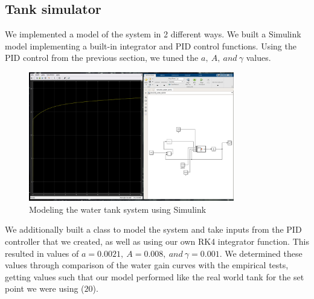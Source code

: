 \documentclass{article}
\begin{document}
\subsection{Tank simulator}
We implemented a model of the system in 2 different ways. We built a Simulink model implementing a built-in integrator and PID control functions. Using the PID control from the previous section, we tuned the $a,\ A,\ and\ \gamma$ values. 
\begin{figure}[H]
    \centering
    \includegraphics[width=0.8\textwidth]{simulink_model.jpg}
    \caption{Modeling the water tank system using Simulink}
    \label{fig:simulink}
\end{figure}

We additionally built a class to model the system and take inputs from the PID controller that we created, as well as using our own RK4 integrator function.
This resulted in values of $a=0.0021,\ A=0.008,\ and\ \gamma=0.001$. We determined these values through comparison of the water gain curves with the empirical tests, getting values such that our model performed like the real world tank for the set point we were using ($20$).
\end{document}
